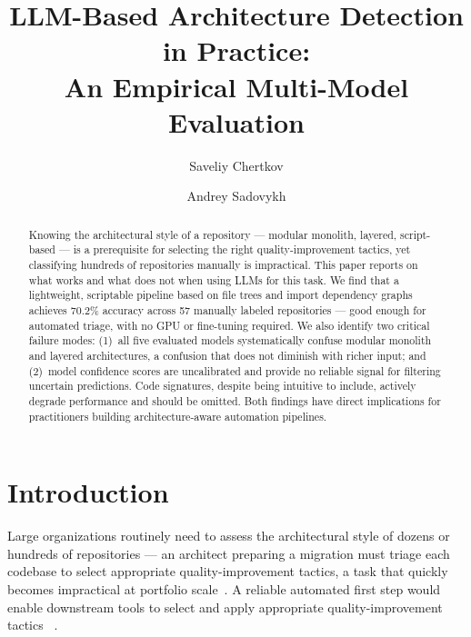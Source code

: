 \documentclass[runningheads]{llncs}
\begin{document}
\sloppy
\title{LLM-Based Architecture Detection in Practice:\\An Empirical Multi-Model Evaluation}


\author{Saveliy Chertkov \and Andrey Sadovykh}


\maketitle

\begin{abstract}
Knowing the architectural style of a repository --- modular monolith, layered, script-based --- is a prerequisite for selecting the right quality-improvement tactics, yet classifying hundreds of repositories manually is impractical. This paper reports on what works and what does not when using LLMs for this task. We find that a lightweight, scriptable pipeline based on file trees and import dependency graphs achieves 70.2\% accuracy across 57 manually labeled repositories --- good enough for automated triage, with no GPU or fine-tuning required. We also identify two critical failure modes: (1)~all five evaluated models systematically confuse modular monolith and layered architectures, a confusion that does not diminish with richer input; and (2)~model confidence scores are uncalibrated and provide no reliable signal for filtering uncertain predictions. Code signatures, despite being intuitive to include, actively degrade performance and should be omitted. Both findings have direct implications for practitioners building architecture-aware automation pipelines.
\end{abstract}

\section{Introduction}
\label{sec:introduction}

Large organizations routinely need to assess the architectural style of dozens or hundreds of repositories --- an architect preparing a migration must triage each codebase to select appropriate quality-improvement tactics, a task that quickly becomes impractical at portfolio scale~\cite{esposito2025generative}. A reliable automated first step would enable downstream tools to select and apply appropriate quality-improvement tactics~\cite{bass2021software} \cite{marquez2022architectural}.
\end{document}

